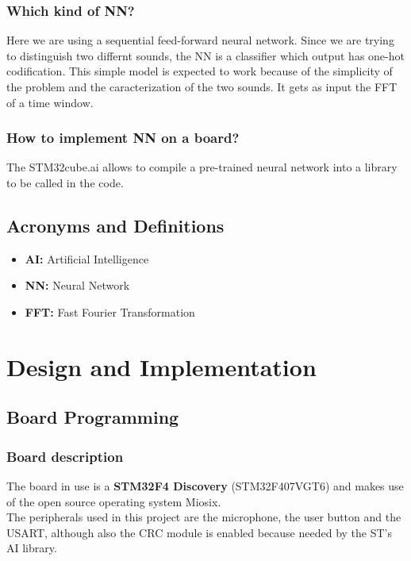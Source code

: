 \subsubsection{Which kind of NN?}
Here we are using a sequential feed-forward neural network. Since we are trying to distinguish two differnt sounds, the NN is a classifier which output has one-hot codification. 
This simple model is expected to work because of the simplicity of the problem and the caracterization of the two sounds. It gets as input the FFT of a time window.
\subsubsection{How to implement NN on a board?}
The STM32cube.ai allows to compile a pre-trained neural network into a library to be called in the code. %

\subsection{Acronyms and Definitions}
\begin{itemize}
 \item \textbf{AI:} Artificial Intelligence
 \item \textbf{NN:} Neural Network
 \item \textbf{FFT:} Fast Fourier Transformation
\end{itemize}


\section{Design and Implementation}
\subsection{Board Programming}
\subsubsection{Board description}
The board in use is a \textbf{STM32F4 Discovery} (STM32F407VGT6) and makes use of the open source operating system Miosix.\\
The peripherals used in this project are the microphone, the user button and the USART, although also the CRC module is enabled because needed by the ST's AI library.


